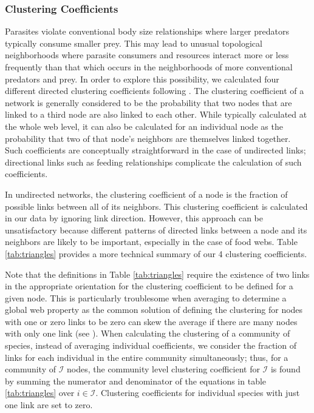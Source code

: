 \documentclass[/home/nkappler/Research/Dissertation/dissertation.tex]{subfiles}
\begin{document}
\begin{bibunit}
\subsubsection{Clustering Coefficients} Parasites violate conventional body
size relationships where larger predators typically consume smaller prey. This
may lead to unusual topological neighborhoods where parasite consumers and
resources interact more or less frequently than that which occurs in the
neighborhoods of more conventional predators and prey. In order to explore this
possibility, we calculated four different directed clustering coefficients
following \cite*{Fagiolo2007}.  The clustering coefficient of a network is
generally considered to be the probability that two nodes that are linked to a
third node are also linked to each other. While typically calculated at the
whole web level, it can also be calculated for an individual node as the
probability that two of that node's neighbors are themselves linked together.
Such coefficients are conceptually straightforward in the case of undirected
links; directional links such as feeding relationships complicate the
calculation of such coefficients.

In undirected networks, the clustering coefficient of a node is the fraction of
possible links between all of its neighbors. This clustering coefficient is  
calculated in our data by ignoring link direction. However, this approach
can be unsatisfactory because different patterns of directed links between a
node and its neighbors are likely to be important, especially in the case of
food webs. Table \ref{tab:triangles} provides a more technical summary of our 4
clustering coefficients.

Note that the definitions in Table \ref{tab:triangles} require the existence of
two links in the appropriate orientation for the clustering coefficient to be
defined for a given node. This is particularly troublesome when averaging to
determine a global web property as the common solution of defining the
clustering for nodes with one or zero links to be zero can skew the average if
there are many nodes with only one link (see \cite*{Kaiser2008}). When
calculating the clustering of a community of species, instead of averaging
individual coefficients, we consider the fraction of links for each individual
in the entire community simultaneously; thus, for a community of $\mathcal{I}$
nodes, the community level clustering coefficient for $\mathcal{I}$ is found by
summing the numerator and denominator of the equations in table
\ref{tab:triangles} over $i\in\mathcal{I}$. Clustering coefficients for
individual species with just one link are set to zero.


\end{bibunit}
\end{document}

